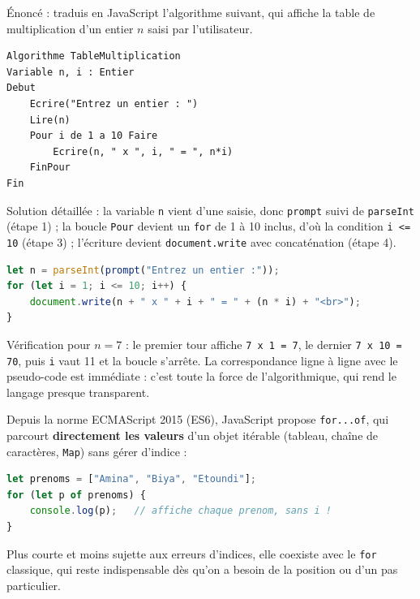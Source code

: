 \documentclass[11pt]{article}
\begin{document}
\begin{exoresolu}
Énoncé : traduis en JavaScript l'algorithme suivant, qui affiche la table de multiplication d'un entier $n$ saisi par l'utilisateur.
\begin{lstlisting}
Algorithme TableMultiplication
Variable n, i : Entier
Debut
    Ecrire("Entrez un entier : ")
    Lire(n)
    Pour i de 1 a 10 Faire
        Ecrire(n, " x ", i, " = ", n*i)
    FinPour
Fin
\end{lstlisting}
\tcblower
Solution détaillée : la variable \texttt{n} vient d'une saisie, donc \texttt{prompt} suivi de \texttt{parseInt} (étape 1) ; la boucle \texttt{Pour} devient un \texttt{for} de 1 à 10 inclus, d'où la condition \texttt{i <= 10} (étape 3) ; l'écriture devient \texttt{document.write} avec concaténation (étape 4).
\begin{lstlisting}[language=JavaScript]
let n = parseInt(prompt("Entrez un entier :"));
for (let i = 1; i <= 10; i++) {
    document.write(n + " x " + i + " = " + (n * i) + "<br>");
}
\end{lstlisting}
Vérification pour $n = 7$ : le premier tour affiche \texttt{7 x 1 = 7}, le dernier \texttt{7 x 10 = 70}, puis \texttt{i} vaut 11 et la boucle s'arrête. La correspondance ligne à ligne avec le pseudo-code est immédiate : c'est toute la force de l'algorithmique, qui rend le langage presque transparent.
\end{exoresolu}

\begin{savaistu}
Depuis la norme ECMAScript 2015 (ES6), JavaScript propose \texttt{for...of}, qui parcourt \textbf{directement les valeurs} d'un objet itérable (tableau, chaîne de caractères, \texttt{Map}) sans gérer d'indice :
\begin{lstlisting}[language=JavaScript]
let prenoms = ["Amina", "Biya", "Etoundi"];
for (let p of prenoms) {
    console.log(p);   // affiche chaque prenom, sans i !
}
\end{lstlisting}
Plus courte et moins sujette aux erreurs d'indices, elle coexiste avec le \texttt{for} classique, qui reste indispensable dès qu'on a besoin de la position ou d'un pas particulier.
\end{savaistu}
\end{document}
